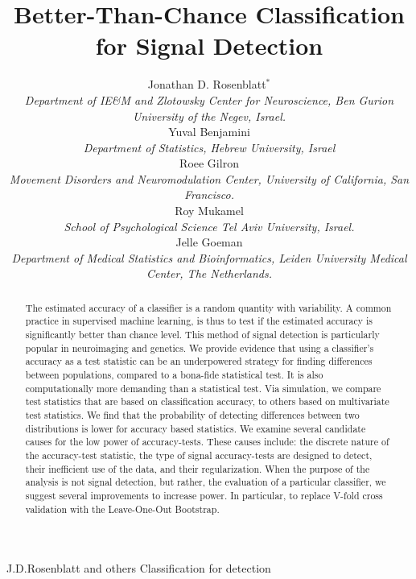 \documentclass[]{bio}
\begin{document}
\title{Better-Than-Chance Classification for Signal Detection}

\author{Jonathan D. Rosenblatt$^\ast$ \\ 
	\textit{Department of IE\&M and Zlotowsky Center for Neuroscience, 
		Ben Gurion University of the Negev, Israel.} 
	\\ Yuval Benjamini \\
	\textit{Department of Statistics, Hebrew University, Israel}	
	\\ Roee Gilron \\ 
	\textit{Movement Disorders and Neuromodulation Center, University of California, San Francisco.}
	\\ Roy Mukamel \\ 
	\textit{School of Psychological Science Tel Aviv University, Israel.}
	\\ Jelle Goeman \\ 
	\textit{Department of Medical Statistics and Bioinformatics, Leiden University Medical Center, The Netherlands.}
}


\markboth%
{J.D.Rosenblatt and others}
{Classification for detection}

\maketitle


\begin{abstract}
{
	The estimated accuracy of a classifier is a random quantity with variability. 
	A common practice in supervised machine learning, is thus to test if the estimated accuracy is significantly better than chance level.
	This method of signal detection is particularly popular in neuroimaging and genetics.
	We provide evidence that using a classifier's accuracy as a test statistic can be an underpowered strategy for finding differences between populations, compared to a bona-fide statistical test.
	It is also computationally more demanding than a statistical test. 
	Via simulation, we compare test statistics that are based on classification accuracy, to others based on multivariate test statistics. 
	We find that the probability of detecting differences between two distributions is lower for accuracy based statistics.
	We examine several candidate causes for the low power of accuracy-tests. 
	These causes include: the discrete nature of the accuracy-test statistic, the type of signal accuracy-tests are designed to detect, their inefficient use of the data, and their regularization. 
	When the purpose of the analysis is not signal detection, but rather, the evaluation of a particular classifier, we suggest several improvements to increase power. 
	In particular, to replace V-fold cross validation with the Leave-One-Out Bootstrap.
	}
\end{abstract}
\end{document}
